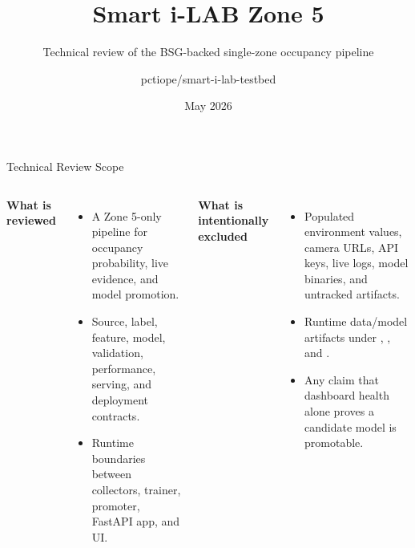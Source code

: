 \documentclass[aspectratio=169]{beamer}
\title{Smart i-LAB Zone 5}
\subtitle{Technical review of the BSG-backed single-zone occupancy pipeline}
\author{pctiope/smart-i-lab-testbed}
\date{May 2026}
\begin{document}

\begin{frame}[shrink=4]{Technical Review Scope}
\begin{columns}[T,onlytextwidth]
\textbf{What is reviewed}
\begin{itemize}
  \item A Zone 5-only pipeline for occupancy probability, live evidence, and model promotion.
  \item Source, label, feature, model, validation, performance, serving, and deployment contracts.
  \item Runtime boundaries between collectors, trainer, promoter, FastAPI app, and UI.
\end{itemize}

\textbf{What is intentionally excluded}
\begin{itemize}
  \item Populated environment values, camera URLs, API keys, live logs, model binaries, and untracked artifacts.
  \item Runtime data/model artifacts under , , and .
  \item Any claim that dashboard health alone proves a candidate model is promotable.
\end{itemize}
\end{columns}
\tightsep
\begin{center}
\hspace{0.4em}
\hspace{0.4em}
\hspace{0.4em}
\end{center}
\end{frame}
\end{document}
